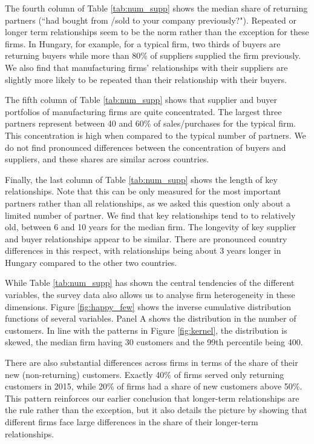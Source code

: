 \documentclass[final, dvipsnames, authoryear,12pt]{elsarticle}
\begin{document}
The fourth column of Table \ref{tab:num_supp} shows the median share of returning partners (``had bought from /sold to your company previously?"). Repeated or longer term relationships seem to be the norm rather than the exception for these firms. In Hungary, for example, for a typical firm, two thirds of buyers are returning buyers while more than 80\% of suppliers supplied the firm previously. We also find that manufacturing firms' relationships with their suppliers are slightly more likely to be repeated than their relationship with their buyers.

The fifth column of Table \ref{tab:num_supp} shows that supplier and buyer portfolios of manufacturing firms are quite concentrated. The largest three partners represent between 40 and 60\% of sales/purchases for the typical firm. This concentration is high when compared to the typical number of partners. We do not find pronounced differences between the concentration of buyers and suppliers, and these shares are similar across countries.

Finally, the last column of Table \ref{tab:num_supp} shows the length of key relationships. Note that this can be only measured for the most important partners rather than all relationships, as we asked this question only about a limited number of partner. We find that key relationships tend to to relatively old, between 6 and 10 years for the median firm. The longevity of key supplier and buyer relationships appear to be similar. There are pronounced country differences in this respect, with relationships being about 3 years longer in Hungary compared to the other two countries. 

While Table \ref{tab:num_supp} has shown the central tendencies of the different variables, the survey data also allows us to analyse firm heterogeneity in these dimensions. Figure \ref{fig:happy_few} shows the inverse cumulative distribution functions of several variables. Panel A shows the distribution in the number of customers. In line with the patterns in Figure \ref{fig:kernel}, the distribution is skewed, the median firm having 30 customers and the 99th percentile being 400.

There are also substantial differences across firms in terms of the share of their new (non-returning) customers. Exactly 40\% of firms served only returning customers in 2015, while 20\% of firms had a share of new customers above 50\%. This pattern reinforces our earlier conclusion that longer-term relationships are the rule rather than the exception, but it also details the picture by showing that different firms face large differences in the share of their longer-term relationships.
\end{document}
